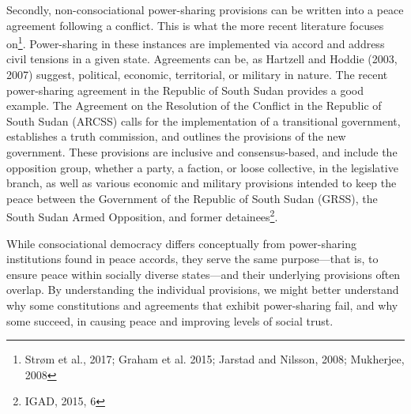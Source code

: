 \documentclass[12pt]{article}
\begin{document}
Secondly, non-consociational power-sharing provisions can be written into a peace agreement following a conflict. This is what the more recent literature focuses on\footnote{Strøm et al., 2017; Graham et al. 2015; Jarstad and Nilsson, 2008; Mukherjee, 2008}. Power-sharing in these instances are implemented via accord and address civil tensions in a given state. Agreements can be, as Hartzell and Hoddie (2003, 2007) suggest, political, economic, territorial, or military in nature. The recent power-sharing agreement in the Republic of South Sudan provides a good example. The Agreement on the Resolution of the Conflict in the Republic of South Sudan (ARCSS) calls for the implementation of a transitional government, establishes a truth commission, and outlines the provisions of the new government. These provisions are inclusive and consensus-based, and include the opposition group, whether a party, a faction, or loose collective, in the legislative branch, as well as various economic and military provisions intended to keep the peace between the Government of the Republic of South Sudan (GRSS), the South Sudan Armed Opposition, and former detainees\footnote{IGAD, 2015, 6}. 

While consociational democracy differs conceptually from power-sharing institutions found in peace accords, they serve the same purpose---that is, to ensure peace within socially diverse states---and their underlying provisions often overlap. By understanding the individual provisions, we might better understand why some constitutions and agreements that exhibit power-sharing fail, and why some succeed, in causing peace and improving levels of social trust. 
\end{document}
